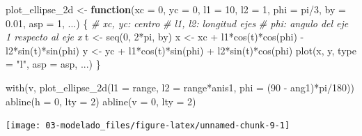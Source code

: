 \documentclass[
  spanish,
]{book}
\newenvironment{Shaded}{\begin{snugshade}}{\end{snugshade}}
\newcommand{\AttributeTok}[1]{\textcolor[rgb]{0.77,0.63,0.00}{#1}}
\newcommand{\CommentTok}[1]{\textcolor[rgb]{0.56,0.35,0.01}{\textit{#1}}}
\newcommand{\ControlFlowTok}[1]{\textcolor[rgb]{0.13,0.29,0.53}{\textbf{#1}}}
\newcommand{\DecValTok}[1]{\textcolor[rgb]{0.00,0.00,0.81}{#1}}
\newcommand{\FloatTok}[1]{\textcolor[rgb]{0.00,0.00,0.81}{#1}}
\newcommand{\FunctionTok}[1]{\textcolor[rgb]{0.00,0.00,0.00}{#1}}
\newcommand{\NormalTok}[1]{#1}
\newcommand{\OtherTok}[1]{\textcolor[rgb]{0.56,0.35,0.01}{#1}}
\newcommand{\SpecialCharTok}[1]{\textcolor[rgb]{0.00,0.00,0.00}{#1}}
\newcommand{\StringTok}[1]{\textcolor[rgb]{0.31,0.60,0.02}{#1}}
\theoremstyle{break}
\begin{document}
\begin{Shaded}
\begin{Highlighting}[]
\NormalTok{plot\_ellipse\_2d }\OtherTok{\textless{}{-}} \ControlFlowTok{function}\NormalTok{(}\AttributeTok{xc =} \DecValTok{0}\NormalTok{, }\AttributeTok{yc =} \DecValTok{0}\NormalTok{, }\AttributeTok{l1 =} \DecValTok{10}\NormalTok{, }\AttributeTok{l2 =} \DecValTok{1}\NormalTok{, }\AttributeTok{phi =}\NormalTok{ pi}\SpecialCharTok{/}\DecValTok{3}\NormalTok{, }
                            \AttributeTok{by =} \FloatTok{0.01}\NormalTok{, }\AttributeTok{asp =} \DecValTok{1}\NormalTok{, ...) \{}
    \CommentTok{\# xc, yc: centro}
    \CommentTok{\# l1, l2: longitud ejes}
    \CommentTok{\# phi: angulo del eje 1 respecto al eje x}
\NormalTok{    t }\OtherTok{\textless{}{-}} \FunctionTok{seq}\NormalTok{(}\DecValTok{0}\NormalTok{, }\DecValTok{2}\SpecialCharTok{*}\NormalTok{pi, by)}
\NormalTok{    x }\OtherTok{\textless{}{-}}\NormalTok{ xc }\SpecialCharTok{+}\NormalTok{ l1}\SpecialCharTok{*}\FunctionTok{cos}\NormalTok{(t)}\SpecialCharTok{*}\FunctionTok{cos}\NormalTok{(phi) }\SpecialCharTok{{-}}\NormalTok{ l2}\SpecialCharTok{*}\FunctionTok{sin}\NormalTok{(t)}\SpecialCharTok{*}\FunctionTok{sin}\NormalTok{(phi)}
\NormalTok{    y }\OtherTok{\textless{}{-}}\NormalTok{ yc }\SpecialCharTok{+}\NormalTok{ l1}\SpecialCharTok{*}\FunctionTok{cos}\NormalTok{(t)}\SpecialCharTok{*}\FunctionTok{sin}\NormalTok{(phi) }\SpecialCharTok{+}\NormalTok{ l2}\SpecialCharTok{*}\FunctionTok{sin}\NormalTok{(t)}\SpecialCharTok{*}\FunctionTok{cos}\NormalTok{(phi)}
    \FunctionTok{plot}\NormalTok{(x, y, }\AttributeTok{type =} \StringTok{"l"}\NormalTok{, }\AttributeTok{asp =}\NormalTok{ asp, ...)}
\NormalTok{\}}

\FunctionTok{with}\NormalTok{(v, }\FunctionTok{plot\_ellipse\_2d}\NormalTok{(}\AttributeTok{l1 =}\NormalTok{ range, }\AttributeTok{l2 =}\NormalTok{ range}\SpecialCharTok{*}\NormalTok{anis1, }
                        \AttributeTok{phi =}\NormalTok{ (}\DecValTok{90} \SpecialCharTok{{-}}\NormalTok{ ang1)}\SpecialCharTok{*}\NormalTok{pi}\SpecialCharTok{/}\DecValTok{180}\NormalTok{))}
\FunctionTok{abline}\NormalTok{(}\AttributeTok{h =} \DecValTok{0}\NormalTok{, }\AttributeTok{lty =} \DecValTok{2}\NormalTok{)}
\FunctionTok{abline}\NormalTok{(}\AttributeTok{v =} \DecValTok{0}\NormalTok{, }\AttributeTok{lty =} \DecValTok{2}\NormalTok{)}
\end{Highlighting}
\end{Shaded}

\begin{center}\texttt{[image: 03-modelado\_files/figure-latex/unnamed-chunk-9-1]} \end{center}
\end{document}
